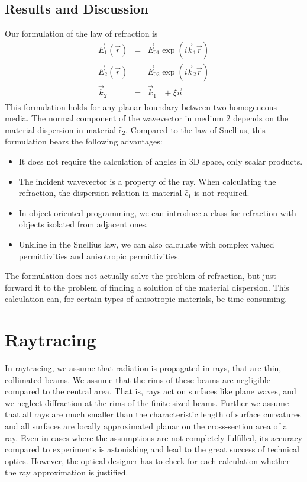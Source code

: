 \documentclass[12pt,a4paper,twoside,openright,BCOR10mm,headsepline,titlepage,abstracton,chapterprefix,final]{scrreprt}
\newcommand\Location{\Vector{r}}
\newcommand\wavenumber{k}
\newcommand\Wavevector{\Vector{\wavenumber}}
\newcommand\Vector[1]{\vec{#1}}
\newcommand\Tensor[1]{\hat{#1}}
\newcommand\scalarEfield{E}
\newcommand\Efield{\Vector{\scalarEfield}}
\newcommand\permittivity{\Tensor{\epsilon}}
\begin{document}
\subsection{Results and Discussion}
Our formulation of the law of refraction is
\begin{eqnarray}
 \Efield_1(\Location) &=& \Efield_{01} \exp(i \Wavevector_1 \Location) \\
 \Efield_2(\Location) &=& \Efield_{02} \exp(i \Wavevector_2 \Location) \\
 \Wavevector_{2} &=& \Wavevector_{1\parallel} + \xi \vec{n}
\end{eqnarray}
This formulation holds for any planar boundary between two homogeneous media. The normal component of the wavevector in medium 2 depends on the material dispersion in material $\permittivity_2$.
Compared to the law of Snellius, this formulation bears the following advantages:
\begin{itemize}
 \item It does not require the calculation of angles in 3D space, only scalar products.
 \item The incident wavevector is a property of the ray. When calculating the refraction, the dispersion relation in material $\permittivity_1$ is not required.
 \item In object-oriented programming, we can introduce a class for refraction with objects isolated from adjacent ones.
 \item Unkline in the Snellius law, we can also calculate with complex valued permittivities and anisotropic permittivities.
\end{itemize}
The formulation does not actually solve the problem of refraction, but just forward it to the problem of finding a solution of the material dispersion. 
This calculation can, for certain types of anisotropic materials, be time consuming.

\section{Raytracing}
In raytracing, we assume that radiation is propagated in rays, that are thin, collimated beams. 
We assume that the rims of these beams are negligible compared to the central area. That is, rays act on surfaces like plane waves, and we neglect diffraction at the rims of the finite sized beams.
Further we assume that all rays are much smaller than the characteristic length of surface curvatures and all surfaces are locally approximated planar on the cross-section area of a ray.
Even in cases where the assumptions are not completely fulfilled, its accuracy compared to experiments is astonishing and lead to the great success of technical optics.
However, the optical designer has to check for each calculation whether the ray approximation is justified.
\end{document}
